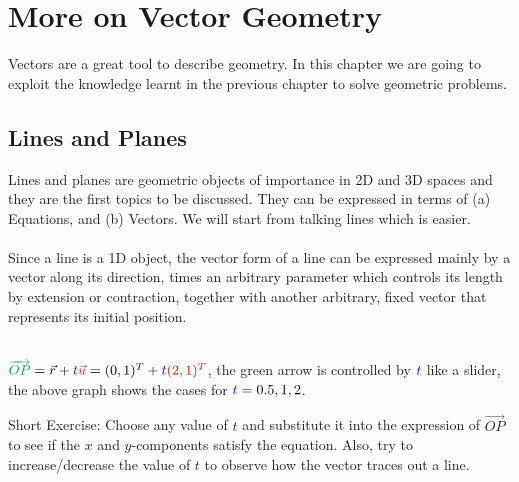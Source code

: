 \chapter{More on Vector Geometry}

Vectors are a great tool to describe geometry. In this chapter we are going to exploit the knowledge learnt in the previous chapter to solve geometric problems.
\section{Lines and Planes}
Lines and planes are geometric objects of importance in 2D and 3D spaces and they are the first topics to be discussed. They can be expressed in terms of
(a) Equations, and (b) Vectors. We will start from talking lines which is easier.\\
\\
Since a line is a 1D object, the vector form of a line can be expressed mainly by a vector along its direction, times an arbitrary parameter which controls its length by extension or contraction, together with another arbitrary, fixed vector that represents its initial position.
\begin{center}
\\
$\textcolor{Green}{\overrightarrow{OP}} = \vec{r} + \textcolor{blue}{t} \textcolor{red}{\vec{u}} = (0,1)^T + \textcolor{blue}{t} \textcolor{red}{(2,1)^T}$, the green arrow is controlled by $\textcolor{blue}{t}$ like a slider, the above graph shows the cases for $\textcolor{blue}{t} = 0.5, 1, 2$.
\end{center}
Short Exercise: Choose any value of $t$ and substitute it into the expression of $\overrightarrow{OP}$ to see if the $x$ and $y$-components satisfy the equation. Also, try to increase/decrease the value of $t$ to observe how the vector traces out a line.

